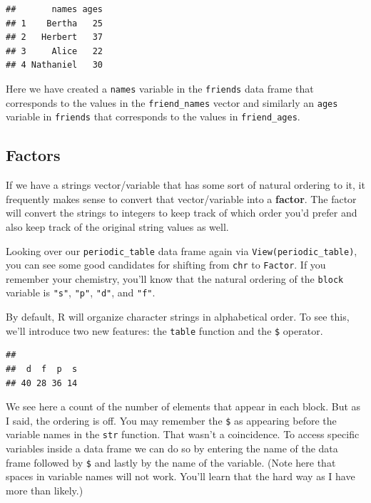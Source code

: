 \documentclass[]{tufte-book}
\newenvironment{Shaded}{\begin{snugshade}}{\end{snugshade}}
\newcommand{\KeywordTok}[1]{\textcolor[rgb]{0.13,0.29,0.53}{\textbf{{#1}}}}
\newcommand{\NormalTok}[1]{{#1}}
\begin{document}
\begin{verbatim}
##       names ages
## 1    Bertha   25
## 2   Herbert   37
## 3     Alice   22
## 4 Nathaniel   30
\end{verbatim}

Here we have created a \texttt{names} variable in the \texttt{friends}
data frame that corresponds to the values in the \texttt{friend\_names}
vector and similarly an \texttt{ages} variable in \texttt{friends} that
corresponds to the values in \texttt{friend\_ages}.

\subsection{Factors}\label{factors}

If we have a strings vector/variable that has some sort of natural
ordering to it, it frequently makes sense to convert that
vector/variable into a \textbf{factor}. The factor will convert the
strings to integers to keep track of which order you'd prefer and also
keep track of the original string values as well.

Looking over our \texttt{periodic\_table} data frame again via
\texttt{View(periodic\_table)}, you can see some good candidates for
shifting from \texttt{chr} to \texttt{Factor}. If you remember your
chemistry, you'll know that the natural ordering of the \texttt{block}
variable is \texttt{"s"}, \texttt{"p"}, \texttt{"d"}, and \texttt{"f"}.

By default, R will organize character strings in alphabetical order. To
see this, we'll introduce two new features: the \texttt{table} function
and the \texttt{\$} operator.

\begin{Shaded}
\end{Shaded}

\begin{verbatim}
## 
##  d  f  p  s 
## 40 28 36 14
\end{verbatim}

We see here a count of the number of elements that appear in each block.
But as I said, the ordering is off. You may remember the \texttt{\$} as
appearing before the variable names in the \texttt{str} function. That
wasn't a coincidence. To access specific variables inside a data frame
we can do so by entering the name of the data frame followed by
\texttt{\$} and lastly by the name of the variable. (Note here that
spaces in variable names will not work. You'll learn that the hard way
as I have more than likely.)
\end{document}
